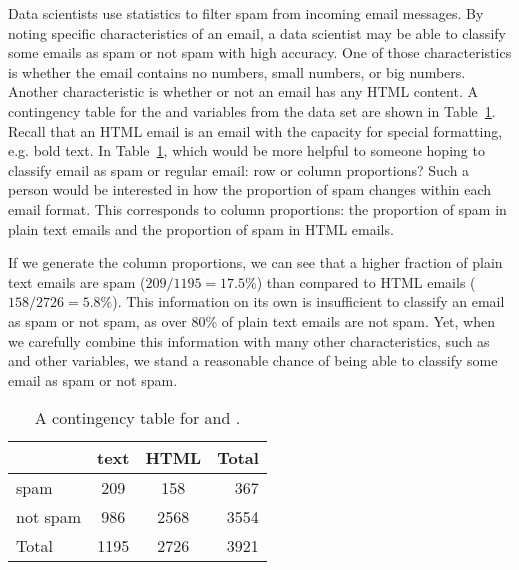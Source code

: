 \begin{example}{Data scientists use statistics to filter spam from incoming email messages. By noting specific characteristics of an email, a data scientist may be able to classify some emails as spam or not spam with high accuracy. One of those characteristics is whether the email contains no numbers, small numbers, or big numbers. Another characteristic is whether or not an email has any HTML content. A contingency table for the  and  variables from the  data set are shown in Table~\ref{emailSpamHTMLTableTotals}. Recall that an HTML email is an email with the capacity for special formatting, e.g. bold text. In Table~\ref{emailSpamHTMLTableTotals}, which would be more helpful to someone hoping to classify email as spam or regular email: row or column proportions?} \label{weighingRowColumnProportions}
Such a person would be interested in how the proportion of spam changes within each email format. This corresponds to column proportions: the proportion of spam in plain text emails and the proportion of spam in HTML emails.

If we generate the column proportions, we can see that a higher fraction of plain text emails are spam ($209/1195 = 17.5\%$) than compared to HTML emails ($158/2726 = 5.8\%$). This information on its own is insufficient to classify an email as spam or not spam, as over 80\% of plain text emails are not spam. Yet, when we carefully combine this information with many other characteristics, such as  and other variables, we stand a reasonable chance of being able to classify some email as spam or not spam. 
\end{example}

\begin{table}[ht]
\centering
\begin{tabular}{l cc r}
  \hline
 & text & HTML & Total \\
  \hline
spam & 209 & 158 & 367 \\
not spam & 986 & 2568 & 3554 \\
   \hline
Total & 1195 & 2726 & 3921 \\
   \hline
\end{tabular}
\caption{A contingency table for  and .}
\label{emailSpamHTMLTableTotals}
\end{table}

